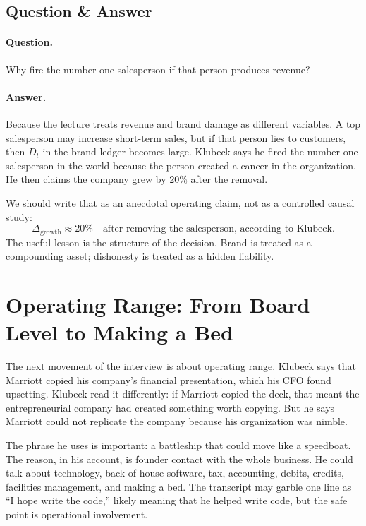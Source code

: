\subsection{Question \& Answer}

\paragraph{Question.}
Why fire the number-one salesperson if that person produces revenue?

\paragraph{Answer.}
Because the lecture treats revenue and brand damage as different variables. A top salesperson may increase short-term sales, but if that person lies to customers, then \(D_t\) in the brand ledger becomes large. Klubeck says he fired the number-one salesperson in the world because the person created a cancer in the organization. He then claims the company grew by \(20\%\) after the removal.

We should write that as an anecdotal operating claim, not as a controlled causal study:
\begin{equation}
\Delta_{\text{growth}} \approx 20\%
\quad
\text{after removing the salesperson, according to Klubeck.}
\end{equation}
The useful lesson is the structure of the decision. Brand is treated as a compounding asset; dishonesty is treated as a hidden liability.

\section{Operating Range: From Board Level to Making a Bed}

The next movement of the interview is about operating range. Klubeck says that Marriott copied his company's financial presentation, which his CFO found upsetting. Klubeck read it differently: if Marriott copied the deck, that meant the entrepreneurial company had created something worth copying. But he says Marriott could not replicate the company because his organization was nimble.

The phrase he uses is important: a battleship that could move like a speedboat. The reason, in his account, is founder contact with the whole business. He could talk about technology, back-of-house software, tax, accounting, debits, credits, facilities management, and making a bed. The transcript may garble one line as ``I hope write the code,'' likely meaning that he helped write code, but the safe point is operational involvement.


